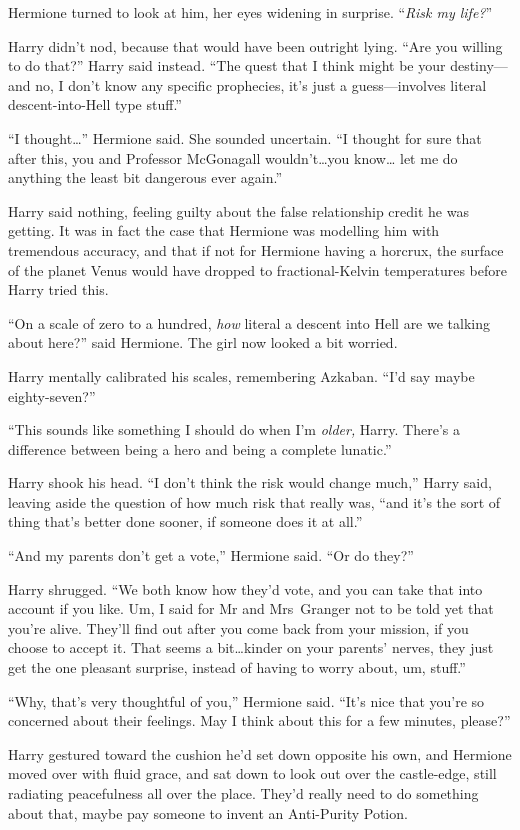 Hermione turned to look at him, her eyes widening in surprise. “\emph{Risk my life?}”

Harry didn’t nod, because that would have been outright lying. “Are you willing to do that?” Harry said instead. “The quest that I think might be your destiny—and no, I don’t know any specific prophecies, it’s just a guess—involves literal descent-into-Hell type stuff.”

“I thought…” Hermione said. She sounded uncertain. “I thought for sure that after this, you and Professor McGonagall wouldn’t…you know… let me do anything the least bit dangerous ever again.”

Harry said nothing, feeling guilty about the false relationship credit he was getting. It was in fact the case that Hermione was modelling him with tremendous accuracy, and that if not for Hermione having a horcrux, the surface of the planet Venus would have dropped to fractional-Kelvin temperatures before Harry tried this.

“On a scale of zero to a hundred, \emph{how} literal a descent into Hell are we talking about here?” said Hermione. The girl now looked a bit worried.

Harry mentally calibrated his scales, remembering Azkaban. “I’d say maybe eighty-seven?”

“This sounds like something I should do when I’m \emph{older,} Harry. There’s a difference between being a hero and being a complete lunatic.”

Harry shook his head. “I don’t think the risk would change much,” Harry said, leaving aside the question of how much risk that really was, “and it’s the sort of thing that’s better done sooner, if someone does it at all.”

“And my parents don’t get a vote,” Hermione said. “Or do they?”

Harry shrugged. “We both know how they’d vote, and you can take that into account if you like. Um, I said for Mr and Mrs~Granger not to be told yet that you’re alive. They’ll find out after you come back from your mission, if you choose to accept it. That seems a bit…kinder on your parents’ nerves, they just get the one pleasant surprise, instead of having to worry about, um, stuff.”

“Why, that’s very thoughtful of you,” Hermione said. “It’s nice that you’re so concerned about their feelings. May I think about this for a few minutes, please?”

Harry gestured toward the cushion he’d set down opposite his own, and Hermione moved over with fluid grace, and sat down to look out over the castle-edge, still radiating peacefulness all over the place. They’d really need to do something about that, maybe pay someone to invent an Anti-Purity Potion.

